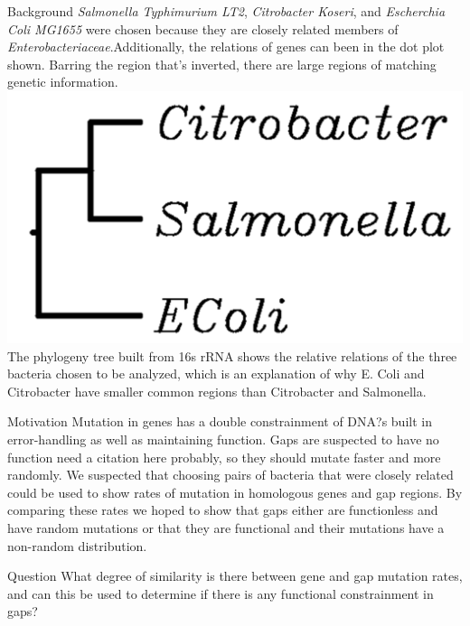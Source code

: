 \documentclass[final]{beamer}
\begin{document}
\begin{frame}{}
\begin{columns}[t]
\begin{column}{.32 \linewidth}
\begin{block}{\large Background}
\newline
\textit{Salmonella Typhimurium LT2}, \textit{Citrobacter Koseri}, and \textit{Escherchia Coli MG1655} were chosen because they are closely related members of \textit{Enterobacteriaceae}.Additionally, the relations of genes can been in the dot plot shown. Barring the region that's inverted, there are large regions of matching genetic information.
\newline
\includegraphics[scale = 1]{phylogeny.png}
\newline
The phylogeny tree built from 16s rRNA shows the relative relations of the three bacteria chosen to be analyzed, which is an explanation of why E. Coli and Citrobacter have smaller common regions than Citrobacter and Salmonella.
\end{block}

 \begin{block}{\large Motivation}
Mutation in genes has a double constrainment of DNA?s built in error-handling as well as maintaining function. Gaps are suspected to have no function need a citation here probably, so they should mutate faster and more randomly. We suspected that choosing pairs of bacteria that were closely related could be used to show rates of mutation in homologous genes and gap regions. By comparing these rates we hoped to show that gaps either are functionless and have random mutations or that they are functional and their mutations have a non-random distribution.
\end{block}

\begin{block}{\large Question}
What degree of similarity is there between gene and gap mutation rates, and can this be used to determine if there is any functional constrainment in gaps? 
\end{block}




\end{column}
\end{columns}
\end{frame}
\end{document}
